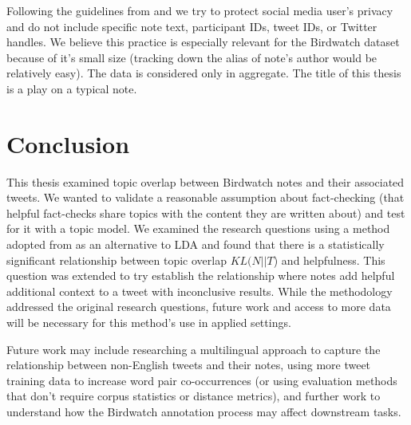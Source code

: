 \documentclass [11pt, proquest] {uwthesis}[2020/02/24]
\begin{document}
Following the guidelines from \cite{williams2017towards} and \cite{fiesler2018participant} we try to protect social media user's privacy and do not include specific note text, participant IDs, tweet IDs, or Twitter handles. We believe this practice is especially relevant for the Birdwatch dataset because of it's small size (tracking down the alias of note's author would be relatively easy). The data is considered only in aggregate. The title of this thesis is a play on a typical note.


\chapter{Conclusion}

This thesis examined topic overlap between Birdwatch notes and their associated tweets. We wanted to validate a reasonable assumption about fact-checking (that helpful fact-checks share topics with the content they are written about) and test for it with a topic model. We examined the research questions using a method adopted from \cite{sia-etal-2020-tired} as an alternative to LDA and found that there is a statistically significant relationship between topic overlap $KL(N || T$) and helpfulness. This question was extended to try establish the relationship where notes add helpful additional context to a tweet with inconclusive results.
While the methodology addressed the original research questions, future work and access to more data will be necessary for this method's use in applied settings.

Future work may include researching a multilingual approach to capture the relationship between non-English tweets and their notes, using more tweet training data to increase word pair co-occurrences (or using evaluation methods that don't require corpus statistics or distance metrics), and further work to understand how the Birdwatch annotation process may affect downstream tasks.





\end{document}
